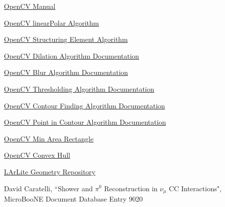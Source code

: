 \begin{thebibliography}{20}
  \href{http://opencv.org}{OpenCV Manual} 

  \href{https://docs.opencv.org/2.4/modules/imgproc/doc/geometric\_transformations.html\#linearpolar}{OpenCV linearPolar Algorithm}

  \href{http://docs.opencv.org/2.4/modules/imgproc/doc/filtering.html\#getstructuringelement}{OpenCV Structuring Element Algorithm}

  \href{http://docs.opencv.org/2.4/modules/imgproc/doc/filtering.html\#dilate}{OpenCV Dilation Algorithm Documentation}

  \href{http://docs.opencv.org/2.4/modules/imgproc/doc/filtering.html\#blur}{OpenCV Blur Algorithm Documentation}
  
  \href{http://docs.opencv.org/2.4/modules/imgproc/doc/miscellaneous\_transformations.html?highlight=threshold\#threshold}{OpenCV Thresholding Algorithm Documentation}
  
  \href{http://docs.opencv.org/2.4/modules/imgproc/doc/structural\_analysis\_and\_shape\_descriptors.html?highlight=findcontours\#findcontours}{OpenCV Contour Finding Algorithm Documentation}

  \href{https://docs.opencv.org/2.4/modules/imgproc/doc/structural\_analysis\_and\_shape\_descriptors.html?highlight=pointpolygontest\#pointpolygontest}{OpenCV Point in Contour Algorithm Documentation}


  \href{http://docs.opencv.org/2.4/modules/imgproc/doc/structural\_analysis\_and\_shape\_descriptors.html?highlight=minarearect\#minarearect}{OpenCV Min Area Rectangle}

  \href{http://docs.opencv.org/2.4/modules/imgproc/doc/structural\_analysis\_and\_shape\_descriptors.html?highlight=convexhull\#convexhull}{OpenCV Convex Hull}

\href{https://github.com/larlight/larlite/blob/trunk/core/LArUtil/GeometryHelper.cxx}{LArLite Geometry Repository}

  David Caratelli, ``Shower and $\pi^0$ Reconstruction in $\nu_{\mu}$ CC Interactions",\\ MicroBooNE Document Database Entry 9020 


\end{thebibliography}
